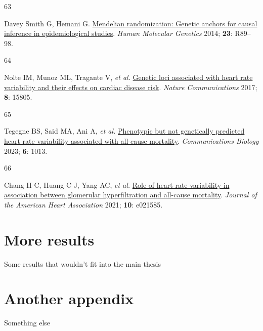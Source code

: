 \documentclass[
  a4paper,
  headsepline=true,
  open=any]{scrbook}
\newlength{\cslhangindent}
\newlength{\csllabelwidth}
\newlength{\cslentryspacingunit} %
\newenvironment{CSLReferences}[2] %
 {%
  \setlength{\parindent}{0pt}
  \ifodd #1
  \let\oldpar\par
  \def\par{\hangindent=\cslhangindent\oldpar}
  \fi
  \setlength{\parskip}{#2\cslentryspacingunit}
 }%
 {}
\newcommand{\CSLLeftMargin}[1]{\parbox[t]{\csllabelwidth}{#1}}
\newcommand{\CSLRightInline}[1]{\parbox[t]{\linewidth - \csllabelwidth}{#1}\break}
\begin{document}
\begin{CSLReferences}{0}{0}
\leavevmode{}%
\CSLLeftMargin{63 }%
\CSLRightInline{Davey Smith G, Hemani G.
\href{https://doi.org/10.1093/hmg/ddu328}{Mendelian randomization:
Genetic anchors for causal inference in epidemiological studies}.
\emph{Human Molecular Genetics} 2014; \textbf{23}: R89--98.}

\leavevmode{}%
\CSLLeftMargin{64 }%
\CSLRightInline{Nolte IM, Munoz ML, Tragante V, \emph{et al.}
\href{https://doi.org/10.1038/ncomms15805}{Genetic loci associated with
heart rate variability and their effects on cardiac disease risk}.
\emph{Nature Communications} 2017; \textbf{8}: 15805.}

\leavevmode{}%
\CSLLeftMargin{65 }%
\CSLRightInline{Tegegne BS, Said MA, Ani A, \emph{et al.}
\href{https://doi.org/10.1038/s42003-023-05376-y}{Phenotypic but not
genetically predicted heart rate variability associated with all-cause
mortality}. \emph{Communications Biology} 2023; \textbf{6}: 1013.}

\leavevmode{}%
\CSLLeftMargin{66 }%
\CSLRightInline{Chang H-C, Huang C-J, Yang AC, \emph{et al.}
\href{https://doi.org/10.1161/JAHA.121.021585}{Role of heart rate
variability in association between glomerular hyperfiltration and
all{-}cause mortality}. \emph{Journal of the American Heart Association}
2021; \textbf{10}: e021585.}

\end{CSLReferences}

\cleardoublepage
{}
{}
\appendix

\hypertarget{sec-more-results}{%
\chapter{More results}\label{sec-more-results}}

Some results that wouldn't fit into the main thesis

\hypertarget{another-appendix}{%
\chapter{Another appendix}\label{another-appendix}}

Something else


\backmatter
\end{document}
